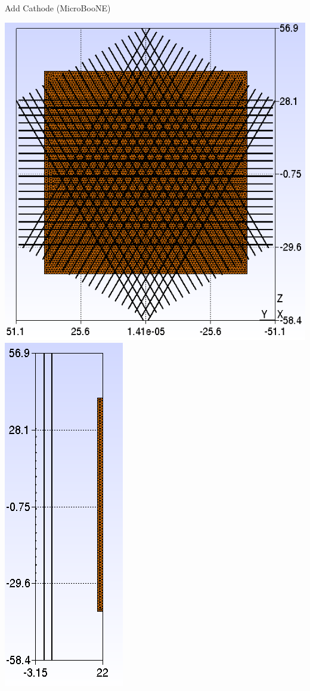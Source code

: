 \documentclass[xcolor=dvipsnames]{beamer}
\newcommand{\microboone}{MicroBooNE\xspace}
\begin{document}
\begin{frame}{Add Cathode (\microboone)}
  \begin{center}
    \includegraphics[height=0.7\textheight]{uboone-mesh-with-plate.png}%
    \includegraphics[height=0.7\textheight]{uboone-mesh-with-plate-side.png}      


\end{center}
\end{frame}
\end{document}
